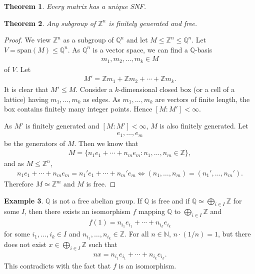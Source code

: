 \documentclass[12pt]{report}
\theoremstyle{plain}
\newtheorem{theorem}{Theorem}[section]
\theoremstyle{remark}
\theoremstyle{definition}
\newtheorem{example}[theorem]{Example}
\newcommand{\N}{\mathbb{N}}
\newcommand{\Z}{\mathbb{Z}}
\newcommand{\Q}{\mathbb{Q}}
\begin{document}
\begin{theorem}
    Every matrix has a unique SNF.
\end{theorem}

\begin{theorem}
    Any subgroup of $\Z^n$ is finitely generated and free.
\end{theorem}
\begin{proof}
    We view $\Z^n$ as a subgroup of $\Q^n$ and let $M\le \Z^n\le \Q^n$. Let $V=\mathrm{span}(M)\le \Q^n$. As $\Q^n$ is a vector space, we can find a $\Q$-basis
    \begin{align*}
        m_1,m_2,\dots,m_k\in M
    \end{align*}
    of $V$. Let
    \begin{align*}
        M' = \Z m_1 + \Z m_2 + \cdots + \Z m_k.
    \end{align*}
    It is clear that $M'\le M$. Consider a $k$-dimensional closed box (or a cell of a lattice) having $m_1,\dots,m_k$ as edges. As $m_1,\dots,m_k$ are vectors of finite length, the box contains finitely many integer points. Hence $[M:M']<\infty$.

    As $M'$ is finitely generated and $[M:M']<\infty$, $M$ is also finitely generated. Let
    \begin{align*}
        e_1,\dots,e_m
    \end{align*}
    be the generators of $M$. Then we know that
    \begin{align*}
        M=\{n_1e_1+\cdots+n_me_m:n_1,\dots,n_m\in \Z\},
    \end{align*}
    and as $M\le \Z^n$,
    \begin{align*}
        n_1e_1+\cdots+n_me_m=n_1'e_1+\cdots+n_m'e_m\iff (n_1,\dots,n_m)=(n_1',\dots,n_m').
    \end{align*}
    Therefore $M\simeq \Z^m$ and $M$ is free.
\end{proof}

\begin{example}
    $\Q$ is not a free abelian group. If $\Q$ is free and if $\Q\simeq \bigoplus_{i\in I} \Z$ for some $I$, then there exists an isomorphism $f$ mapping $\Q$ to $\bigoplus_{i\in I} \Z$ and
    \begin{align*}
        f(1) = n_{i_1} e_{i_1}+\cdots+n_{i_k}e_{i_k}
    \end{align*}
    for some $i_1,\dots,i_k\in I$ and $n_{i_1},\dots,n_{i_k}\in \Z$. For all $n\in \N$, $n\cdot(1/n)=1$, but there does not exist $x\in \bigoplus_{i\in I} \Z$ such that
    \begin{align*}
        nx = n_{i_1} e_{i_1}+\cdots+n_{i_k}e_{i_k}.
    \end{align*}
    This contradicts with the fact that $f$ is an isomorphism.
\end{example}
\end{document}
